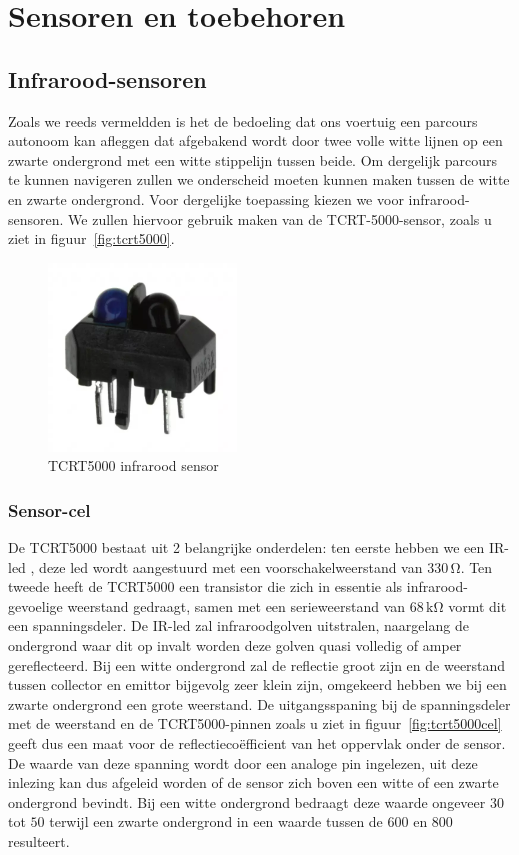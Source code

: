 \section{Sensoren en toebehoren}
\subsection{Infrarood-sensoren}
Zoals we reeds vermeldden is het de bedoeling dat ons voertuig een parcours autonoom kan afleggen dat afgebakend wordt door twee volle witte lijnen op een zwarte ondergrond met een witte stippelijn tussen beide. Om dergelijk parcours te kunnen navigeren zullen we onderscheid moeten kunnen maken tussen de witte en zwarte ondergrond. Voor dergelijke toepassing kiezen we voor infrarood-sensoren. We zullen hiervoor gebruik maken van de TCRT-5000-sensor, zoals u ziet in figuur~\vref{fig:tcrt5000}. 

\begin{figure}[H]
	\centering
	\includegraphics[height=5cm]{tcrt5000.png}
	\caption{TCRT5000 infrarood sensor\label{fig:tcrt5000}}
\end{figure}

\subsubsection*{Sensor-cel}
De TCRT5000 bestaat uit 2 belangrijke onderdelen: ten eerste hebben we een IR-led , deze led wordt aangestuurd met een voorschakelweerstand van $330\,\mathrm{\Omega}$. Ten tweede heeft de TCRT5000 een transistor die zich in essentie als infrarood-gevoelige weerstand gedraagt, samen met een serieweerstand van $68\,\mathrm{k\Omega}$ vormt dit een spanningsdeler. De IR-led zal infraroodgolven uitstralen, naargelang de ondergrond waar dit op invalt worden deze golven quasi volledig of amper gereflecteerd. Bij een witte ondergrond zal de reflectie groot zijn en de weerstand tussen collector en emittor bijgevolg zeer klein zijn, omgekeerd hebben we bij een zwarte ondergrond een grote weerstand. De uitgangsspaning bij de spanningsdeler met de weerstand en de TCRT5000-pinnen zoals u ziet in figuur~\vref{fig:tcrt5000cel} geeft dus een maat voor de reflectieco\"efficient van het oppervlak onder de sensor. De waarde van deze spanning wordt door een analoge pin ingelezen, uit deze inlezing kan dus afgeleid worden of de sensor zich boven een witte of een zwarte ondergrond bevindt. Bij een witte ondergrond bedraagt deze waarde ongeveer $30$ tot $50$ terwijl een zwarte ondergrond in een waarde tussen de $600$ en $800$ resulteert.

